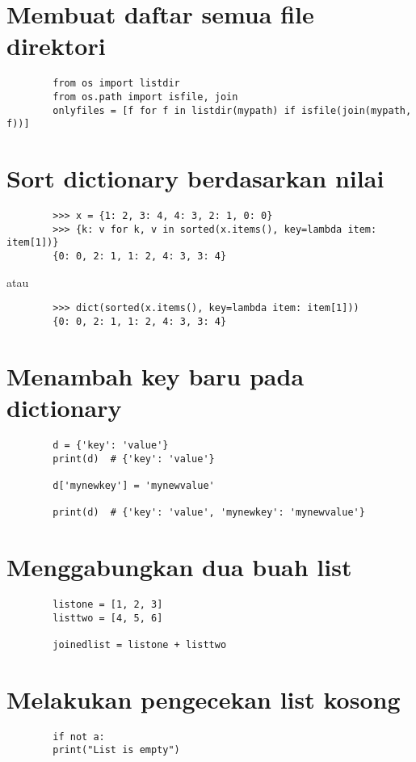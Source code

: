 \documentclass{article}
\begin{document}
	\section {Membuat daftar semua file direktori}
	\begin{lstlisting}
		from os import listdir
		from os.path import isfile, join
		onlyfiles = [f for f in listdir(mypath) if isfile(join(mypath, f))]
	\end{lstlisting}
	
	\section {Sort dictionary berdasarkan nilai}
	\begin{lstlisting}
		>>> x = {1: 2, 3: 4, 4: 3, 2: 1, 0: 0}
		>>> {k: v for k, v in sorted(x.items(), key=lambda item: item[1])}
		{0: 0, 2: 1, 1: 2, 4: 3, 3: 4}
	\end{lstlisting}
	atau
	\begin{lstlisting}
		>>> dict(sorted(x.items(), key=lambda item: item[1]))
		{0: 0, 2: 1, 1: 2, 4: 3, 3: 4}
	\end{lstlisting}
	
	\section {Menambah key baru pada dictionary}
	\begin{lstlisting}
		d = {'key': 'value'}
		print(d)  # {'key': 'value'}
		
		d['mynewkey'] = 'mynewvalue'
		
		print(d)  # {'key': 'value', 'mynewkey': 'mynewvalue'}
	\end{lstlisting}
	
	\section {Menggabungkan dua buah list}
	\begin{lstlisting}
		listone = [1, 2, 3]
		listtwo = [4, 5, 6]
		
		joinedlist = listone + listtwo
	\end{lstlisting}
	
	\section {Melakukan pengecekan list kosong}
	\begin{lstlisting}
		if not a:
		print("List is empty")
	\end{lstlisting}
	
\end{document}

